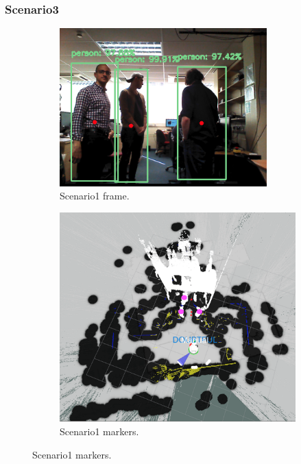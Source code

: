 \subsubsection{Scenario3}

\begin{figure}[H]
    \begin{subfigure}{.5\textwidth}
        \centering
        \includegraphics[width=8cm]{images/chapter6_scenario3.png}
        \caption{Scenario1 frame.}
        \label{2a}
	\end{subfigure}
    \begin{subfigure}{.5\textwidth}
        \centering
        \includegraphics[width=.9\linewidth]{images/chapter6_extend3.png}
        \caption{Scenario1 markers.}
        \label{2b}
	\end{subfigure}
\end{figure}

